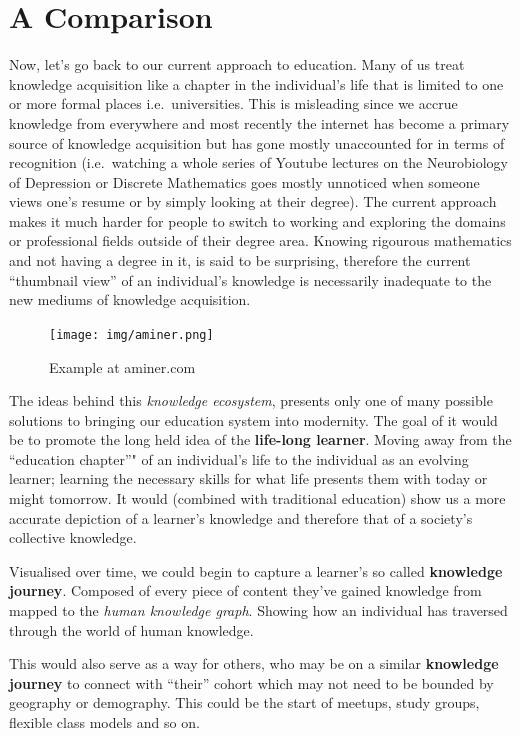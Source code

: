 \documentclass{acm_proc_article-sp}
\begin{document}
\section{A Comparison}\label{a-comparison}

Now, let's go back to our current approach to education. Many of us
treat knowledge acquisition like a chapter in the individual's life that
is limited to one or more formal places i.e.~universities. This is
misleading since we accrue knowledge from everywhere and most recently
the internet has become a primary source of knowledge acquisition but
has gone mostly unaccounted for in terms of recognition (i.e.~watching a
whole series of Youtube lectures on the Neurobiology of Depression or
Discrete Mathematics goes mostly unnoticed when someone views one's
resume or by simply looking at their degree). The current approach makes
it much harder for people to switch to working and exploring the domains
or professional fields outside of their degree area. Knowing rigourous
mathematics and not having a degree in it, is said to be surprising,
therefore the current ``thumbnail view'' of an individual's knowledge is
necessarily inadequate to the new mediums of knowledge acquisition.

\begin{figure}
\centering
\texttt{[image: img/aminer.png]}
\caption{Example at aminer.com}
\end{figure}

The ideas behind this \emph{knowledge ecosystem}, presents only one of
many possible solutions to bringing our education system into modernity.
The goal of it would be to promote the long held idea of the
\textbf{life-long learner}. Moving away from the ``education chapter''"
of an individual's life to the individual as an evolving learner;
learning the necessary skills for what life presents them with today or
might tomorrow. It would (combined with traditional education) show us a
more accurate depiction of a learner's knowledge and therefore that of a
society's collective knowledge.

Visualised over time, we could begin to capture a learner's so called
\textbf{knowledge journey}. Composed of every piece of content they've
gained knowledge from mapped to the \emph{human knowledge graph}.
Showing how an individual has traversed through the world of human
knowledge.

This would also serve as a way for others, who may be on a similar
\textbf{knowledge journey} to connect with ``their'' cohort which may
not need to be bounded by geography or demography. This could be the
start of meetups, study groups, flexible class models and so on.
\end{document}
